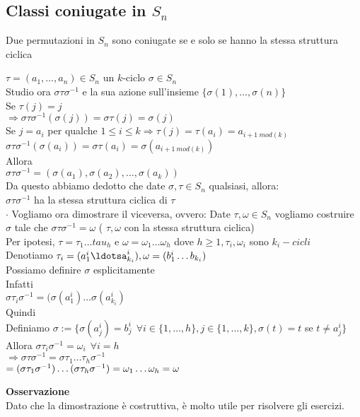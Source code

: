 \documentclass[12px]{article}
\begin{document}
{	\subsection{Classi coniugate in $S_n$}
	\begin{teo}[Fondamentale]
		Due permutazioni in $S_n$ sono coniugate se e solo se hanno la stessa struttura ciclica
	\end{teo}
	\begin{dimo}
	  	$\tau = (a_1,\ldots, a_n)\in S_n$ un $k$-ciclo $\sigma \in S_n$\\
		Studio ora  $\sigma \tau\sigma^{-1}$ e la sua azione sull'insieme  $\{\sigma(1),\ldots, \sigma(n)\}$\\
		Se  $\tau(j) = j$\\
		$ \Rightarrow \sigma \tau \sigma^{-1}(\sigma(j)) = \sigma\tau(j) = \sigma (j)$ \\
		Se $j = a_i$ per qualche $1\leq i\leq k \Rightarrow \tau (j) = \tau (a_i) = a_{i + 1 \ mod(k)}$ \\
		$\sigma\tau\sigma^{-1}(\sigma(a_i)) = \sigma\tau(a_i) = \sigma (a_{i + 1 \ mod(k)})$\\
		Allora \\
		$\sigma\tau\sigma^{-1} = (\sigma(a_1),\sigma(a_2),\ldots, \sigma(a_k))$\\
		 Da questo abbiamo dedotto che date $\sigma, \tau\in S_n$  qualsiasi, allora:\\
		 $\sigma\tau\sigma^{-1}$ ha la stessa struttura ciclica di $\tau$\\
		 $\cdot$ Vogliamo ora dimostrare il viceversa, ovvero: Date $\tau,\omega\in S_n$ vogliamo costruire  $\sigma$ tale che $\sigma\tau\sigma^{-1} = \omega$ ( $\tau,\omega$ con la stessa struttura ciclica)\\
		 Per ipotesi, $\tau = \tau_1\ldots tau_h$ e $\omega = \omega_1\ldots\omega_h$ dove $h\geq 1, \tau_i,\omega_i$ sono  $k_i-cicli$\\
		 Denotiamo  $\tau_i = (a_1^i\ldotsa^i_{k_i}), \omega = (b_1^i\ldots b_{k_i})$\\
		 Possiamo definire $\sigma$ esplicitamente\\
		 Infatti\\
		 $\sigma\tau_i\sigma^{-1} = (\sigma(a_1^i)\ldots\sigma(a_{k_i}^i)$\\
		 Quindi\\
		 Definiamo $\sigma := \{\sigma (a_j^i) = b_j^i \ \ \forall i\in\{1,\ldots, h\}, j\in \{1,\ldots,k\}, \sigma (t) = t $ se $t\neq a_j^i\}$\\
		 Allora $\sigma\tau_i\sigma^{-1} = \omega_i \ \ \forall i = h$\\
		 $ \Rightarrow \sigma\tau\sigma^{-1} = \sigma\tau_1\ldots\tau_h\sigma^{-1}$ \\
		 $= (\sigma\tau_1\sigma^{-1})\ldots(\sigma\tau_h\sigma^{-1})\\
		 =\omega_1\ldots\omega_h = \omega$
	\end{dimo}
	\textbf{Osservazione}\\
	Dato che la dimostrazione è costruttiva, è molto utile per risolvere gli esercizi.
}
\end{document}
